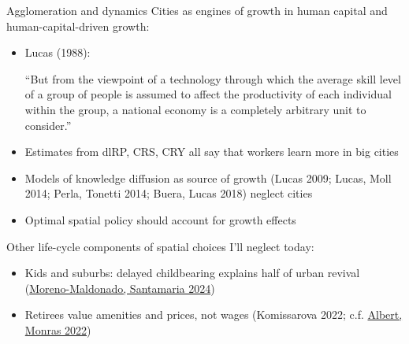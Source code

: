 \documentclass[11pt,notes=hide,aspectratio=169]{beamer}
\begin{document}
\begin{frame}{Agglomeration and dynamics}
Cities as engines of growth in human capital and human-capital-driven growth:
\begin{itemize}
\item Lucas (1988): {\small ``But from the viewpoint of a technology through which the average skill level of a group of people is assumed to affect the productivity of each individual within the group, a national economy is a completely arbitrary unit to consider.''\par}
\item Estimates from dlRP, CRS, CRY all say that workers learn more in big cities
\item Models of knowledge diffusion as source of growth (Lucas 2009; Lucas, Moll 2014; Perla, Tonetti 2014; Buera, Lucas 2018) neglect cities
\item Optimal spatial policy should account for growth effects
\end{itemize}
\medskip
{\footnotesize Other life-cycle components of spatial choices I'll neglect today:
\begin{itemize}
\item {Kids and suburbs: delayed childbearing explains half of urban revival (\href{https://sites.google.com/view/clarasantamaria/research}{Moreno-Maldonado, Santamaria 2024})\par}
\item Retirees value amenities and prices, not wages (Komissarova 2022; c.f. \href{https://www.aeaweb.org/articles?id=10.1257/aer.20211241}{Albert, Monras 2022})
\end{itemize}
\par}
\end{frame}
\newcommand{\R}{\mathbb{R}}
\end{document}
